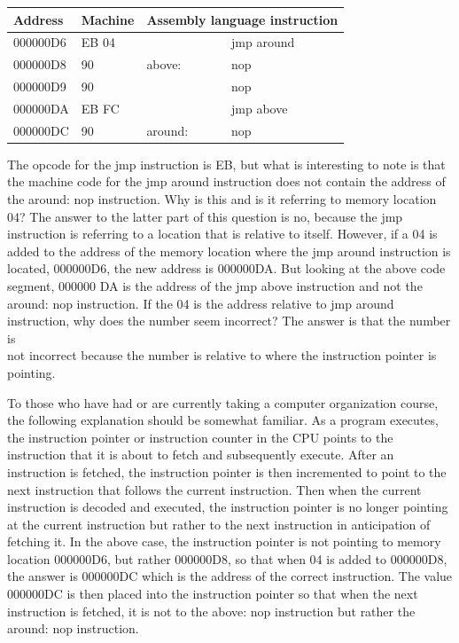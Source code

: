 \documentclass[10pt]{article}
\begin{document}
\begin{center}
\begin{tabular}{|l|l|l|l|}
\hline
Address & Machine & \multicolumn{2}{|l|}{Assembly language instruction} \\
\hline
000000D6 & EB 04 &  & jmp around \\
\hline
000000D8 & 90 & above: & nop \\
\hline
000000D9 & 90 &  & nop \\
\hline
000000DA & EB FC &  & jmp above \\
\hline
000000DC & 90 & around: & nop \\
\hline
\end{tabular}
\end{center}

The opcode for the jmp instruction is EB, but what is interesting to note is that the machine code for the jmp around instruction does not contain the address of the around: nop instruction. Why is this and is it referring to memory location 04? The answer to the latter part of this question is no, because the jmp instruction is referring to a location that is relative to itself. However, if a 04 is added to the address of the memory location where the jmp around instruction is located, 000000D6, the new address is 000000DA. But looking at the above code segment, 000000 DA is the address of the jmp above instruction and not the around: nop instruction. If the 04 is the address relative to jmp around instruction, why does the number seem incorrect? The answer is that the number is\\
not incorrect because the number is relative to where the instruction pointer is pointing.

To those who have had or are currently taking a computer organization course, the following explanation should be somewhat familiar. As a program executes, the instruction pointer or instruction counter in the CPU points to the instruction that it is about to fetch and subsequently execute. After an instruction is fetched, the instruction pointer is then incremented to point to the next instruction that follows the current instruction. Then when the current instruction is decoded and executed, the instruction pointer is no longer pointing at the current instruction but rather to the next instruction in anticipation of fetching it. In the above case, the instruction pointer is not pointing to memory location 000000D6, but rather 000000D8, so that when 04 is added to 000000D8, the answer is 000000DC which is the address of the correct instruction. The value 000000DC is then placed into the instruction pointer so that when the next instruction is fetched, it is not to the above: nop instruction but rather the around: nop instruction.
\end{document}
